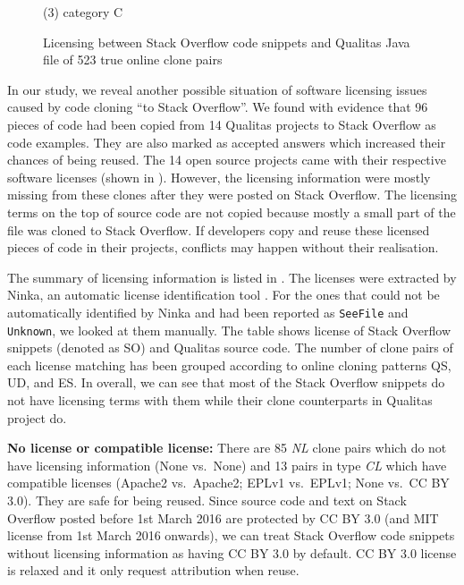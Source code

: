 \documentclass{sig-alternate-05-2015}
\begin{document}
\begin{figure}
	\caption*{(3) category C}\label{fig:heatmap_c}
	\endminipage
	\caption{Licensing between Stack Overflow code snippets and Qualitas Java file of 523 true online clone pairs}
\end{figure}

In our study, we reveal another possible situation of software licensing issues caused by code cloning ``to Stack Overflow''. We found with evidence that 96 pieces of code had been copied from 14 Qualitas projects to Stack Overflow as code examples. They are also marked as accepted answers which increased their chances of being reused. The 14 open source projects came with their respective software licenses (shown in ). However, the licensing information were mostly missing from these clones after they were posted on Stack Overflow. The licensing terms on the top of source code are not copied because mostly a small part of the file was cloned to Stack Overflow. If developers copy and reuse these licensed pieces of code in their projects, conflicts may happen without their realisation. 

The summary of licensing information is listed in . The licenses were extracted by Ninka, an automatic license identification tool \cite{German2010}. For the ones that could not be automatically identified by Ninka and had been reported as \texttt{SeeFile} and \texttt{Unknown}, we looked at them manually.  The table shows license of Stack Overflow snippets (denoted as SO) and Qualitas source code. The number of clone pairs of each license matching has been grouped according to online cloning patterns QS, UD, and ES. In overall, we can see that most of the Stack Overflow snippets do not have licensing terms with them while their clone counterparts in Qualitas project do. 

\textbf{No license or compatible license:} There are 85 \textit{NL} clone pairs which do not have licensing information (None vs.~None) and 13 pairs in type \textit{CL} which have compatible licenses (Apache2 vs.~Apache2; EPLv1 vs.~EPLv1; None vs.~CC BY 3.0). They are safe for being reused. Since source code and text on Stack Overflow posted before 1st March 2016 are protected by CC BY 3.0 (and MIT license from 1st March 2016 onwards), we can treat Stack Overflow code snippets without licensing information as having CC BY 3.0 by default. CC BY 3.0 license is relaxed and it only request attribution when reuse. 
\end{document}

